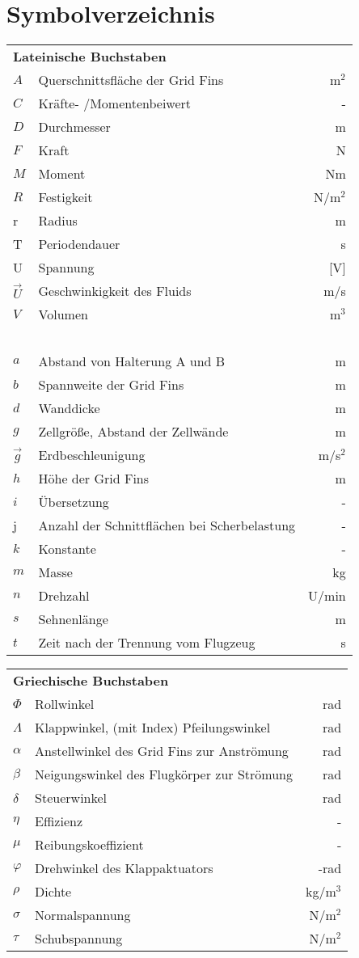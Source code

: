 \chapter*{Symbolverzeichnis}						%

\begin{longtable}[l]{llr}
\multicolumn{3}{l}{\textbf{Lateinische Buchstaben}}\\
$A$&Querschnittsfläche der Grid Fins&m$^2$\\
$C$&Kräfte- /Momentenbeiwert&-\\
$D$&Durchmesser&m\\
$F$&Kraft&N\\
$M$&Moment&Nm\\
$R$&Festigkeit&N/m$^2$\\
r&Radius&m\\
T&Periodendauer&s\\
U&Spannung&[V]\\
$\vec{U}$&Geschwinkigkeit des Fluids&m/s\\
$V$&Volumen&m$^3$\\
~&&\\
$a$&Abstand von Halterung A und B&m\\
$b$&Spannweite der Grid Fins&m\\
$d$&Wanddicke&m\\
$g$&Zellgröße, Abstand der Zellwände&m\\
$\vec{g}$&Erdbeschleunigung&m/s$^2$\\
$h$&Höhe der Grid Fins&m\\
$i$&Übersetzung&-\\
j&Anzahl der Schnittflächen bei Scherbelastung&-\\
$k$&Konstante&-\\
$m$&Masse&kg\\
$n$&Drehzahl&U/min\\
$s$&Sehnenlänge&m\\
$t$&Zeit nach der Trennung vom Flugzeug&s\\
\end{longtable}


\begin{longtable}[l]{llr}
	\multicolumn{3}{l}{\textbf{Griechische Buchstaben}}\\
	$\Phi$&Rollwinkel&rad\\
	$\Lambda$&Klappwinkel, (mit Index) Pfeilungswinkel&rad\\
	$\alpha$&Anstellwinkel des Grid Fins zur Anströmung&rad\\
	$\beta$&Neigungswinkel des Flugkörper zur Strömung&rad\\
	$\delta$&Steuerwinkel&rad\\
	$\eta$&Effizienz&-\\
	$\mu$&Reibungskoeffizient&-\\
	$\varphi$&Drehwinkel des Klappaktuators&-rad\\
	$\rho$&Dichte&kg/m$^3$\\
	$\sigma$&Normalspannung&N/m$^2$\\
	$\tau$&Schubspannung&N/m$^2$\\
\end{longtable}

